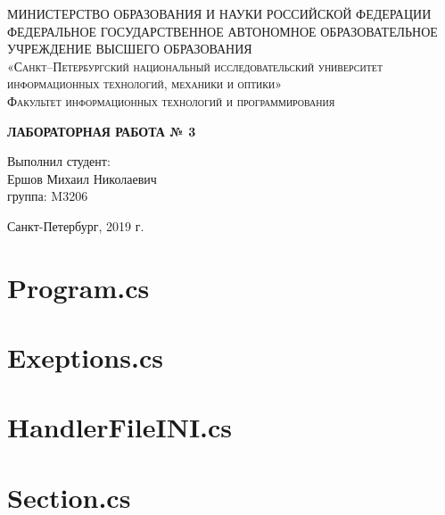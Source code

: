 \documentclass{article}
\begin{document}
        \begin{titlepage}
        \begin{center}
        \textsc{МИНИСТЕРСТВО ОБРАЗОВАНИЯ И НАУКИ РОССИЙСКОЙ ФЕДЕРАЦИИ ФЕДЕРАЛЬНОЕ ГОСУДАРСТВЕННОЕ АВТОНОМНОЕ ОБРАЗОВАТЕЛЬНОЕ УЧРЕЖДЕНИЕ ВЫСШЕГО ОБРАЗОВАНИЯ\\[5mm]
        «Санкт–Петербургский национальный исследовательский университет информационных технологий, механики и оптики»\\[20mm]
        Факультет информационных технологий и программирования\\[5mm]
        }
        \vfill
        
        \textbf{ЛАБОРАТОРНАЯ РАБОТА № 3 \\[20mm]}
        \end{center}
        
        \hfill
        \begin{minipage}{.3\textwidth}
        Выполнил студент:\\[2mm] 
        Ершов Михаил Николаевич \\
        группа: M3206\\[5mm]
        \end{minipage}%
        \vfill
        \begin{center}
        Санкт-Петербург, 2019 г.
        \end{center}
        \end{titlepage}
 
\section{Program.cs}
 
\newpage
\section{Exeptions.cs}
 
\newpage
\section{HandlerFileINI.cs}
 
\newpage
\section{Section.cs}
 

\newpage
\end{document}
